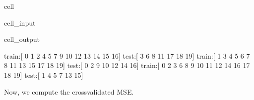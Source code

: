 \documentclass[letterpaper,10pt,english]{jupyterBook}
\begin{document}
\begin{sphinxuseclass}{cell}\begin{sphinxVerbatimInput}

\begin{sphinxuseclass}{cell_input}
\begin{sphinxVerbatim}[commandchars=\\\{\}]
   
    
   
   
    
     
\end{sphinxVerbatim}

\end{sphinxuseclass}\end{sphinxVerbatimInput}
\begin{sphinxVerbatimOutput}

\begin{sphinxuseclass}{cell_output}
\begin{sphinxVerbatim}[commandchars=\\\{\}]
train:[ 0  1  2  4  5  7  9 10 12 13 14 15 16]  	test:[ 3  6  8 11 17 18 19]
train:[ 1  3  4  5  6  7  8 11 13 15 17 18 19]  	test:[ 0  2  9 10 12 14 16]
train:[ 0  2  3  6  8  9 10 11 12 14 16 17 18 19]  	test:[ 1  4  5  7 13 15]
\end{sphinxVerbatim}

\end{sphinxuseclass}\end{sphinxVerbatimOutput}

\end{sphinxuseclass}
\sphinxAtStartPar
Now, we compute the cross\sphinxhyphen{}validated MSE.
\end{document}
